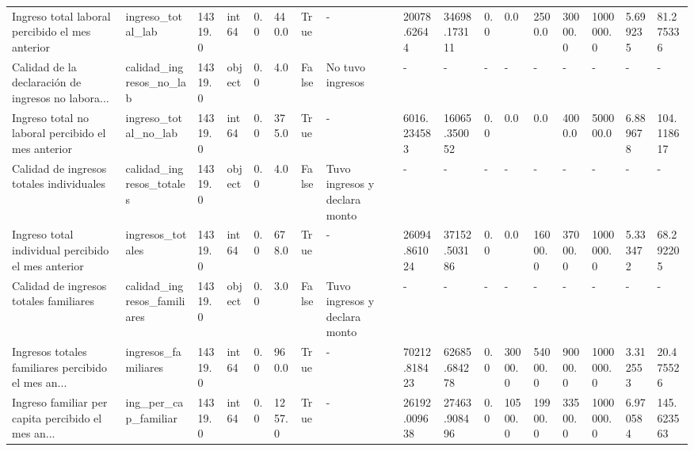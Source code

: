 \documentclass[a4paper]{article}
\begin{document}
\begin{landscape}
{\begin{tabular}{lllllllllllllllll}
        Ingreso total laboral percibido el mes anterior    &            ingreso\_total\_lab &  14319.0 &    int64 &     0.0 &   440.0 &    True &                              - &   20078.62644 &  34698.173111 &  0.0 &      0.0 &   2500.0 &  30000.0 &  1000000.0 &   5.699235 &   81.275336 \\
        Calidad de la declaración de ingresos no labora... &      calidad\_ingresos\_no\_lab &  14319.0 &   object &     0.0 &     4.0 &   False &               No tuvo ingresos &             - &             - &    - &        - &        - &        - &          - &          - &           - \\
        Ingreso total no laboral percibido el mes anterior &         ingreso\_total\_no\_lab &  14319.0 &    int64 &     0.0 &   375.0 &    True &                              - &   6016.234583 &  16065.350052 &  0.0 &      0.0 &      0.0 &   4000.0 &   500000.0 &   6.889678 &  104.118617 \\
        Calidad de ingresos totales individuales           &     calidad\_ingresos\_totales &  14319.0 &   object &     0.0 &     4.0 &   False &  Tuvo ingresos y declara monto &             - &             - &    - &        - &        - &        - &          - &          - &           - \\
        Ingreso total individual percibido el mes anterior &             ingresos\_totales &  14319.0 &    int64 &     0.0 &   678.0 &    True &                              - &  26094.861024 &  37152.503186 &  0.0 &      0.0 &  16000.0 &  37000.0 &  1000000.0 &   5.333472 &   68.292205 \\
        Calidad de ingresos totales familiares             &  calidad\_ingresos\_familiares &  14319.0 &   object &     0.0 &     3.0 &   False &  Tuvo ingresos y declara monto &             - &             - &    - &        - &        - &        - &          - &          - &           - \\
        Ingresos totales familiares percibido el mes an... &          ingresos\_familiares &  14319.0 &    int64 &     0.0 &   960.0 &    True &                              - &  70212.818423 &  62685.684278 &  0.0 &  30000.0 &  54000.0 &  90000.0 &  1000000.0 &   3.312553 &   20.475526 \\
        Ingreso familiar per capita percibido el mes an... &         ing\_per\_cap\_familiar &  14319.0 &    int64 &     0.0 &  1257.0 &    True &                              - &  26192.009638 &  27463.908496 &  0.0 &  10500.0 &  19900.0 &  33500.0 &  1000000.0 &   6.970584 &  145.623563 \\

\end{tabular}}
\end{landscape}
\end{document}
